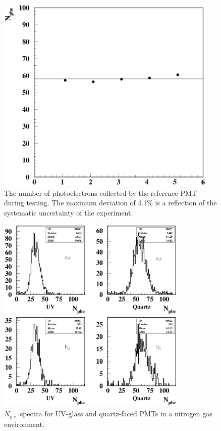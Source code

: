 \begin{figure}
\hspace{0.5cm}
\begin{centering}
\includegraphics[height=9.5cm]{PMT-studies/stab.eps}
\vspace{0.5cm}
\caption{\small{The number of photoelectrons collected by the reference 
PMT during testing.  The maximum deviation of 4.1\% is a reflection of 
the systematic uncertainty of the experiment.}}
\label{ref_pmt}
\end{centering}
 \end{figure}

\begin{figure}
\hspace{0.5cm}
\begin{centering}
\includegraphics[height=9.5cm]{PMT-studies/gas_spectra.eps}
\vspace{0.5cm}
\caption{\small{$N_{p.e.}$ spectra for UV-glass and quartz-faced PMTs in 
a nitrogen gas environment.}}
\label{ntogas}
\end{centering}
\end{figure}

